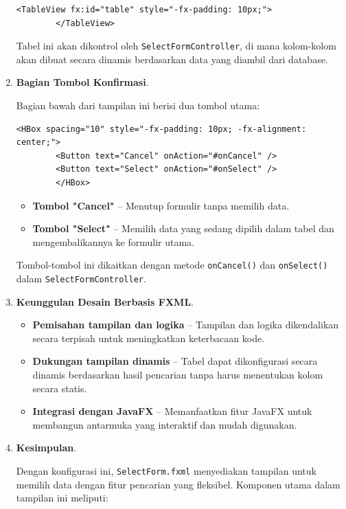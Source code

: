 \begin{enumerate}
	\begin{lstlisting}[style=XmlStyle]
		<TableView fx:id="table" style="-fx-padding: 10px;">
		</TableView>
	\end{lstlisting}
	
	Tabel ini akan dikontrol oleh \texttt{SelectFormController}, di mana kolom-kolom akan dibuat secara dinamis berdasarkan data yang diambil dari database.
	
	\item \textbf{Bagian Tombol Konfirmasi}.
	
	Bagian bawah dari tampilan ini berisi dua tombol utama:
	
	\begin{lstlisting}[style=XmlStyle]
		<HBox spacing="10" style="-fx-padding: 10px; -fx-alignment: center;">
		<Button text="Cancel" onAction="#onCancel" />
		<Button text="Select" onAction="#onSelect" />
		</HBox>
	\end{lstlisting}
	
	\begin{itemize}
		\item \textbf{Tombol "Cancel"} – Menutup formulir tanpa memilih data.
		\item \textbf{Tombol "Select"} – Memilih data yang sedang dipilih dalam tabel dan mengembalikannya ke formulir utama.
	\end{itemize}
	
	Tombol-tombol ini dikaitkan dengan metode \texttt{onCancel()} dan \texttt{onSelect()} dalam \texttt{SelectFormController}.
	
	\item \textbf{Keunggulan Desain Berbasis FXML}.
	
	\begin{itemize}
		\item \textbf{Pemisahan tampilan dan logika} – Tampilan dan logika dikendalikan secara terpisah untuk meningkatkan keterbacaan kode.
		\item \textbf{Dukungan tampilan dinamis} – Tabel dapat dikonfigurasi secara dinamis berdasarkan hasil pencarian tanpa harus menentukan kolom secara statis.
		\item \textbf{Integrasi dengan JavaFX} – Memanfaatkan fitur JavaFX untuk membangun antarmuka yang interaktif dan mudah digunakan.
	\end{itemize}
	
	\item \textbf{Kesimpulan}.
	
	Dengan konfigurasi ini, \texttt{SelectForm.fxml} menyediakan tampilan untuk memilih data dengan fitur pencarian yang fleksibel. Komponen utama dalam tampilan ini meliputi:
	

\end{enumerate}
